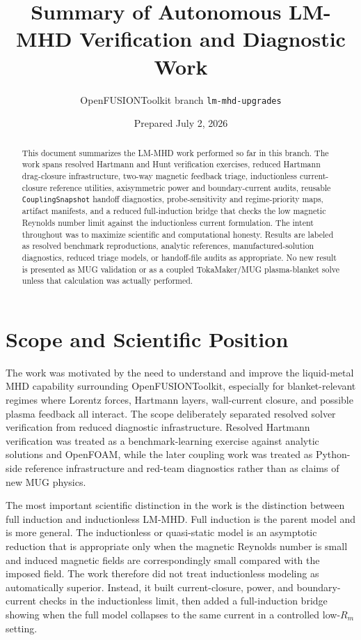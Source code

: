 \documentclass[11pt]{article}
\title{Summary of Autonomous LM-MHD Verification and Diagnostic Work}
\author{OpenFUSIONToolkit branch \texttt{lm-mhd-upgrades}}
\date{Prepared July 2, 2026}
\begin{document}
\maketitle

\begin{abstract}
This document summarizes the LM-MHD work performed so far in this branch. The work spans resolved Hartmann and Hunt verification exercises, reduced Hartmann drag-closure infrastructure, two-way magnetic feedback triage, inductionless current-closure reference utilities, axisymmetric power and boundary-current audits, reusable \texttt{CouplingSnapshot} handoff diagnostics, probe-sensitivity and regime-priority maps, artifact manifests, and a reduced full-induction bridge that checks the low magnetic Reynolds number limit against the inductionless current formulation. The intent throughout was to maximize scientific and computational honesty. Results are labeled as resolved benchmark reproductions, analytic references, manufactured-solution diagnostics, reduced triage models, or handoff-file audits as appropriate. No new result is presented as MUG validation or as a coupled TokaMaker/MUG plasma-blanket solve unless that calculation was actually performed.
\end{abstract}

\section{Scope and Scientific Position}

The work was motivated by the need to understand and improve the liquid-metal MHD capability surrounding OpenFUSIONToolkit, especially for blanket-relevant regimes where Lorentz forces, Hartmann layers, wall-current closure, and possible plasma feedback all interact. The scope deliberately separated resolved solver verification from reduced diagnostic infrastructure. Resolved Hartmann verification was treated as a benchmark-learning exercise against analytic solutions and OpenFOAM, while the later coupling work was treated as Python-side reference infrastructure and red-team diagnostics rather than as claims of new MUG physics.

The most important scientific distinction in the work is the distinction between full induction and inductionless LM-MHD. Full induction is the parent model and is more general. The inductionless or quasi-static model is an asymptotic reduction that is appropriate only when the magnetic Reynolds number is small and induced magnetic fields are correspondingly small compared with the imposed field. The work therefore did not treat inductionless modeling as automatically superior. Instead, it built current-closure, power, and boundary-current checks in the inductionless limit, then added a full-induction bridge showing when the full model collapses to the same current in a controlled low-\(R_m\) setting.
\end{document}

